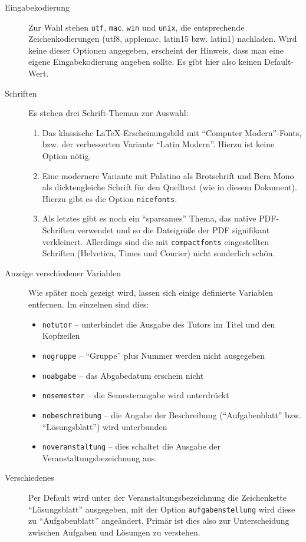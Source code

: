 \documentclass[nicefonts,nogruppe,nosemester,noveranstaltung,notutor,noabgabe,utf]{uhb-inf}
\begin{document}
\begin{description}
	\item[Eingabekodierung] Zur Wahl stehen \texttt{utf}, \texttt{mac}, \texttt{win} und \texttt{unix}, die entsprechende Zeichenkodierungen (utf8, applemac, latin15 bzw. latin1) nachladen. Wird keine dieser Optionen angegeben, erscheint der Hinweis, dass man eine eigene Eingabekodierung angeben sollte. Es gibt hier also keinen Default-Wert.
	\item[Schriften] Es stehen drei Schrift-Theman zur Auswahl:
	\begin{enumerate}
		\item Das klassische \LaTeX-Erscheinungsbild mit "`Computer Modern"'-Fonts, bzw. der verbesserten Variante "`Latin Modern"'. Hierzu ist keine Option nötig.
		\item Eine modernere Variante mit Palatino als Brotschrift und Bera Mono als dicktengleiche Schrift für den Quelltext (wie in diesem Dokument). Hierzu gibt es die Option \texttt{nicefonts}.
		\item Als letztes gibt es noch ein "`sparsames"' Thema, das native PDF-Schriften verwendet und so die Dateigröße der PDF signifikant verkleinert. Allerdings sind die mit \texttt{compactfonts} eingestellten Schriften (Helvetica, Times und Courier) nicht sonderlich schön.
	\end{enumerate}
	\item[Anzeige verschiedener Variablen] Wie später noch gezeigt wird, lassen sich einige definierte Variablen entfernen. Im einzelnen sind dies:
	\begin{itemize}
		\item \texttt{notutor} -- unterbindet die Ausgabe des Tutors im Titel und den Kopfzeilen
		\item \texttt{nogruppe} -- "`Gruppe"' plus Nummer werden nicht ausgegeben
		\item \texttt{noabgabe} -- das Abgabedatum erschein nicht
		\item \texttt{nosemester} -- die Semesterangabe wird unterdrückt
		\item \texttt{nobeschreibung} -- die Angabe der Beschreibung ("`Aufgabenblatt"' bzw. "`Lösungsblatt"') wird unterbunden
		\item \texttt{noveranstaltung} -- dies schaltet die Ausgabe der Veranstaltungsbezeichnung aus.
	\end{itemize}
	\item[Verschiedenes]
	Per Default wird unter der Veranstaltungsbezeichnung die Zeichenkette "`Lösungsblatt"' ausgegeben, mit der Option \texttt{aufgabenstellung} wird diese zu "`Aufgabenblatt"' angeändert. Primär ist dies also zur Unterscheidung zwischen Aufgaben und Lösungen zu verstehen.
\end{description}
\end{document}
